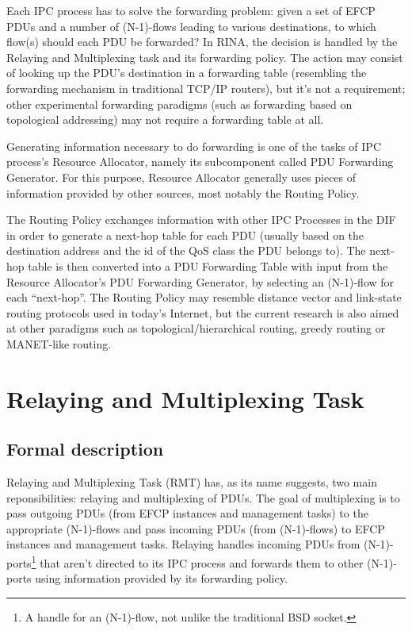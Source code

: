         Each IPC process has to solve the forwarding problem: given a set of EFCP PDUs and a number of (N-1)-flows leading to various destinations, to which flow(s) should each PDU be forwarded? In RINA, the decision is handled by the Relaying and Multiplexing task and its forwarding policy. The action may consist of looking up the PDU's destination in a forwarding table (resembling the forwarding mechanism in traditional TCP/IP routers), but it's not a requirement; other experimental forwarding paradigms (such as forwarding based on topological addressing) may not require a forwarding table at all.

        Generating information necessary to do forwarding is one of the tasks of IPC process's Resource Allocator, namely its subcomponent called PDU Forwarding Generator. For this purpose, Resource Allocator generally uses pieces of information provided by other sources, most notably the Routing Policy.

        The Routing Policy exchanges information with other IPC Processes in the DIF in order to generate a next-hop table for each PDU (usually based on the destination address and the id of the QoS class the PDU belongs to). The next-hop table is then converted into a PDU Forwarding Table with input from the Resource Allocator's PDU Forwarding Generator, by selecting an (N-1)-flow for each ``next-hop''. The Routing Policy may resemble distance vector and link-state routing protocols used in today's Internet, but the current research is also aimed at other paradigms such as topological/hierarchical routing, greedy routing or MANET-like routing.


    \section{Relaying and Multiplexing Task}

        \subsection{Formal description}

            Relaying and Multiplexing Task (RMT) has, as its name suggests, two main reponsibilities: relaying and multiplexing of PDUs. The goal of multiplexing is to pass outgoing PDUs (from EFCP instances and management tasks) to the appropriate (N-1)-flows and pass incoming PDUs (from (N-1)-flows) to EFCP instances and management tasks. Relaying handles incoming PDUs from (N-1)-ports\footnote{A handle for an (N-1)-flow, not unlike the traditional BSD socket.} that aren't directed to its IPC process and forwards them to other (N-1)-ports using information provided by its forwarding policy.

